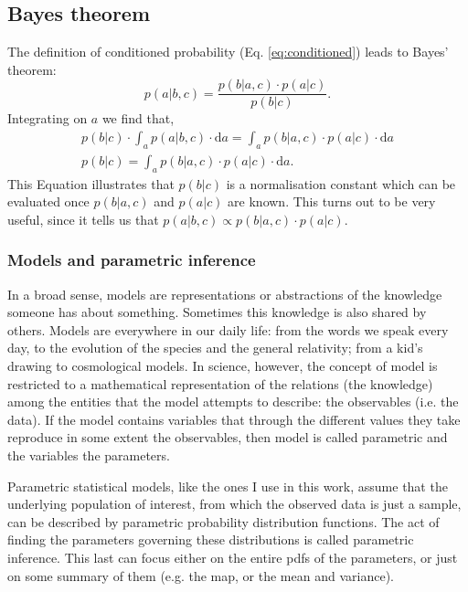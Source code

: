 \subsection{Bayes theorem}
The definition of conditioned probability (Eq. \ref{eq:conditioned}) leads to Bayes' theorem:
\begin{equation}
p(a|b,c) = \frac{p(b|a,c)\cdot p(a|c)}{p(b|c)}.
\end{equation}
Integrating on $a$ we find that,
\begin{align}
\label{eq:evidence}
p(b|c) \cdot \int_a p(a|b,c)\cdot \mathrm{d}a = \int_a p(b|a,c) \cdot p(a|c) \cdot \mathrm{d}a \nonumber \\
p(b|c) = \int_a p(b|a,c) \cdot p(a|c) \cdot \mathrm{d}a.
\end{align}
This Equation illustrates that $p(b|c)$ is a normalisation constant which can be evaluated once $p(b|a,c)$ and $p(a|c)$ are known. This turns out to be very useful, since it tells us that $p(a|b,c) \propto p(b|a,c) \cdot p(a|c)$.

\subsubsection{Models and parametric inference}
\label{sect:parametric_inference}
In a broad sense, models are representations or abstractions of the knowledge someone has about something. Sometimes this knowledge is also shared by others. Models are everywhere in our daily life: from the words we speak every day, to the evolution of the species and the general relativity; from a kid's drawing to cosmological models. In science, however, the concept of model is restricted to a mathematical representation of the relations (the knowledge) among the entities that the model attempts to describe: the observables (i.e. the data). If the model contains variables that through the different values they take reproduce in some extent the observables, then model is called parametric and the variables the parameters. 

{Parametric statistical models, like the ones I use in this work, assume that the underlying population of interest, from which the observed data is just a sample, can be described by parametric probability distribution functions. The act of finding the parameters governing these distributions is called parametric inference. This last can focus either on the entire \glspl{pdf} of the parameters, or just on some summary of them (e.g. the  \gls{map}, or the mean and variance).}

